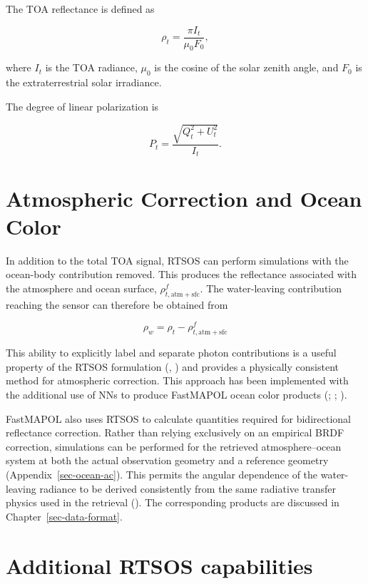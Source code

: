 \documentclass[
  11pt,
  letterpaper,
]{scrreprt}
\begin{document}
The TOA reflectance is defined as

\[
\rho_t =
\frac{\pi I_t}{\mu_0 F_0},
\]

where \(I_t\) is the TOA radiance, \(\mu_0\) is the cosine of the solar
zenith angle, and \(F_0\) is the extraterrestrial solar irradiance.

The degree of linear polarization is

\[
P_t =
\frac{\sqrt{Q_t^2+U_t^2}}{I_t}.
\]

\section{Atmospheric Correction and Ocean
Color}\label{atmospheric-correction-and-ocean-color}

In addition to the total TOA signal, RTSOS can perform simulations with
the ocean-body contribution removed. This produces the reflectance
associated with the atmosphere and ocean surface,
\(\rho^{f}_{t,\mathrm{atm+sfc}}\). The water-leaving contribution
reaching the sensor can therefore be obtained from

\[
\rho_w = \rho_t-\rho^{f}_{t,\mathrm{atm+sfc}}
\]

This ability to explicitly label and separate photon contributions is a
useful property of the RTSOS formulation
(,
) and provides a physically consistent
method for atmospheric correction. This approach has been implemented
with the additional use of NNs to produce FastMAPOL ocean color products
(;
;
).

FastMAPOL also uses RTSOS to calculate quantities required for
bidirectional reflectance correction. Rather than relying exclusively on
an empirical BRDF correction, simulations can be performed for the
retrieved atmosphere--ocean system at both the actual observation
geometry and a reference geometry (Appendix~\ref{sec-ocean-ac}). This
permits the angular dependence of the water-leaving radiance to be
derived consistently from the same radiative transfer physics used in
the retrieval (). The
corresponding products are discussed in Chapter~\ref{sec-data-format}.

\section{Additional RTSOS
capabilities}\label{additional-rtsos-capabilities}
\end{document}
